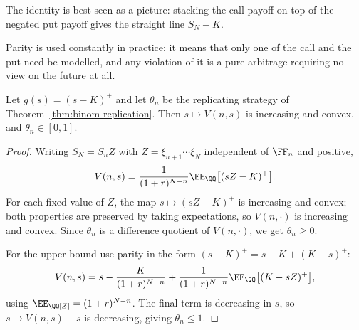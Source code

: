 The identity is best seen as a picture: stacking the call payoff on top of the negated put payoff gives the straight line $S_N - K$.

\begin{center}
\end{center}

Parity is used constantly in practice: it means that only one of the call and the put need be modelled, and any violation of it is a pure arbitrage requiring no view on the future at all.

\begin{proposition}
	Let $g(s) = (s-K)^+$ and let $\theta_n$ be the replicating strategy of Theorem~\ref{thm:binom-replication}. Then $s \mapsto V(n,s)$ is increasing and convex, and $\theta_n \in [0,1]$.
\end{proposition}

\begin{proof}
	Writing $S_N = S_n Z$ with $Z = \xi_{n+1}\cdots\xi_N$ independent of $\FF_n$ and positive,
	$$
	V(n,s) = \frac{1}{(1+r)^{N-n}}\EE_\QQ\big[(sZ-K)^+\big].
	$$
	For each fixed value of $Z$, the map $s\mapsto (sZ-K)^+$ is increasing and convex; both properties are preserved by taking expectations, so $V(n,\cdot)$ is increasing and convex. Since $\theta_n$ is a difference quotient of $V(n,\cdot)$, we get $\theta_n \geq 0$.

	For the upper bound use parity in the form $(s-K)^+ = s - K + (K-s)^+$:
	$$
	V(n,s) = s - \frac{K}{(1+r)^{N-n}} + \frac{1}{(1+r)^{N-n}}\EE_\QQ\big[(K-sZ)^+\big],
	$$
	using $\EE_\QQ[Z] = (1+r)^{N-n}$. The final term is decreasing in $s$, so $s\mapsto V(n,s) - s$ is decreasing, giving $\theta_n \leq 1$.
\end{proof}

